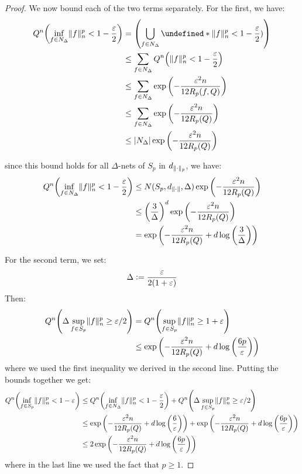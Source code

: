 \documentclass{article}
\theoremstyle{plain}
\theoremstyle{definition}
\theoremstyle{remark}
\newcommand{\defeq}{\vcentcolon=}
\let\brace\undefined
\DeclarePairedDelimiter{\brace}{\lbrace}{\rbrace}
\DeclarePairedDelimiter{\paren}{\lparen}{\rparen}
\newcommand{\eps}{\varepsilon}
\newcommand{\logp}[1]{\log{\left(#1\right)}}
\DeclarePairedDelimiter{\abs}{\lvert}{\rvert}
\DeclarePairedDelimiter{\norm}{\lVert}{\rVert}
\begin{document}
\begin{proof}
    We now bound each of the two terms separately. For the first, we have:
    \begin{align*}
        Q^{n}\paren*{\inf_{f \in N_{\Delta}} \norm{f}_n^p < 1 - \frac{\eps}{2}} &= \paren*{\bigcup_{f \in N_{\Delta}} \brace*{\norm{f}_n^p < 1 - \frac{\eps}{2})}} \\ 
        &\leq \sum_{f \in N_{\Delta}} Q^{n}\paren*{\norm{f}_n^p < 1 - \frac{\eps}{2}} \\
        &\leq \sum_{f \in N_{\Delta}} \exp{\paren*{-\frac{\eps^2n}{12 R_p(f, Q)}}} \\
        &\leq \sum_{f \in N_{\Delta}} \exp{\paren*{-\frac{\eps^2n}{12 R_p(Q)}}} \\
        &\leq \abs{N_\Delta} \exp{\paren*{-\frac{\eps^2n}{12 R_p(Q)}}}
    \end{align*}

    since this bound holds for all $\Delta$-nets of $S_p$ in $d_{\norm{\cdot}_p}$, we have:
    \begin{align*}
        Q^{n}\paren*{\inf_{f \in N_{\Delta}} \norm{f}_n^p < 1 - \frac{\eps}{2}} &\leq N(S_p, d_{\norm{\cdot}}, \Delta) \exp{\paren*{-\frac{\eps^2n}{12 R_p(Q)}}} \\
        &\leq \paren*{\frac{3}{\Delta}}^{d} \exp{\paren*{-\frac{\eps^2n}{12 R_p(Q)}}} \\
        &= \exp{\paren*{-\frac{\eps^2n}{12 R_p(Q)} + d \logp{\frac{3}{\Delta}}}}
    \end{align*}

    For the second term, we set:
    \begin{equation*}
        \Delta \defeq \frac{\eps}{2(1+\eps)}
    \end{equation*}
    Then:
    \begin{align*}
        Q^{n}\paren*{\Delta \sup_{f \in S_p} \norm{f}_n^p \geq \eps/2} &= Q^{n}\paren*{\sup_{f \in S_p} \norm{f}_n^p \geq 1 + \eps} \\
        &\leq \exp{\paren*{-\frac{\eps^2n}{12 R_p(Q)} + d \logp{\frac{6p}{\eps}}}}
    \end{align*}
    where we used the first inequality we derived in the second line. Putting the bounds together we get:
    \begin{align*}
        Q^{n}\paren*{\inf_{f \in S_p} \norm{f}_n^{p} < 1- \eps} &\leq Q^{n}\paren*{\inf_{f \in N_{\Delta}} \norm{f}_{n}^p < 1-\frac{\eps}{2}} + Q^{n}\paren*{\Delta \sup_{f \in S_p} \norm{f}_n^p \geq \eps/2} \\
        &\leq \exp{\paren*{-\frac{\eps^2n}{12 R_p(Q)} + d \logp{\frac{6}{\eps}}}} + \exp{\paren*{-\frac{\eps^2n}{12 R_p(Q)} + d \logp{\frac{6p}{\eps}}}} \\
        &\leq 2 \exp{\paren*{-\frac{\eps^2n}{12 R_p(Q)} + d \logp{\frac{6p}{\eps}}}}
    \end{align*}
    where in the last line we used the fact that $p \geq 1$.

    
\end{proof}
\end{document}
